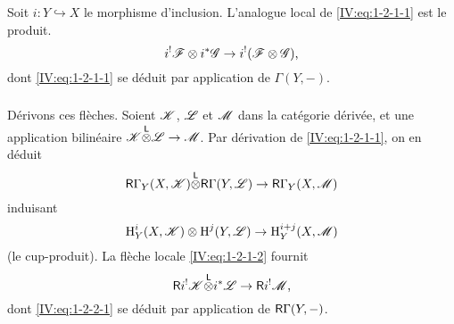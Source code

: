 Soit $i:Y\hookrightarrow X$ le morphisme d'inclusion. L'analogue local de 
\eqref{IV:eq:1-2-1-1} est le produit.
\begin{equation}\label{IV:eq:1-2-1-2}
  i^!\mathscr{F}\otimes i^*\mathscr{G} \to i^!(\mathscr{F}\otimes\mathscr{G}) \text{,}
\end{equation}
dont \eqref{IV:eq:1-2-1-1} se déduit par application de $\Gamma(Y,-)$. 





\subsubsection{}\label{IV:1-2-2}

Dérivons ces flèches. Soient $\mathscr{K}$, $\mathscr{L}$ et $\mathscr{M}$ dans la catégorie 
dérivée, et une application bilinéaire $\mathscr{K}{\overset{\mathsf{L}}{\otimes}}\mathscr{L}\to\mathscr{M}$. Par 
dérivation de \eqref{IV:eq:1-2-1-1}, on en déduit 
\begin{equation}\label{IV:eq:1-2-2-1}
  \mathsf{R}\Gamma_Y(X,\mathscr{K}) {\overset{\mathsf{L}}{\otimes}} \mathsf{R}\Gamma(Y,\mathscr{L}) \to \mathsf{R}\Gamma_Y(X,\mathscr{M}) 
\end{equation}
induisant 
\begin{equation}\label{IV:eq:1-2-2-2}
  \operatorname{H}_Y^i(X,\mathscr{K})\otimes \operatorname{H}^j(Y,\mathscr{L}) \to \operatorname{H}_Y^{i+j}(X,\mathscr{M})
\end{equation}
(le cup-produit). La flèche locale \eqref{IV:eq:1-2-1-2} fournit 
\begin{equation}\label{IV:eq:1-2-2-3}
  \mathsf{R} i^! \mathscr{K}{\overset{\mathsf{L}}{\otimes}} i^*\mathscr{L} \to \mathsf{R} i^!\mathscr{M} \text{,}
\end{equation}
dont \eqref{IV:eq:1-2-2-1} se déduit par application de $\mathsf{R}\Gamma(Y,-)$. 





\subsubsection{}\label{IV:1-2-3}

